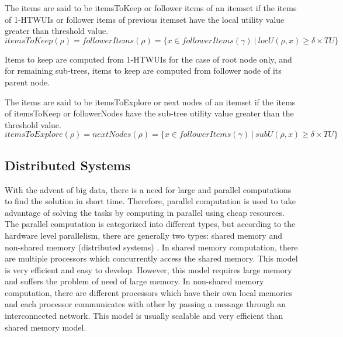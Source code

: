 \documentclass[11pt,openright]{report}
\begin{document}
\begin{definition}
	The items are said to be itemsToKeep or follower items of an itemset if the items of 1-HTWUIs or follower items of previous itemset have the local utility value greater than threshold value.
	\begin{equation}
	itemsToKeep(\rho) = followerItems(\rho) = \{x \in followerItems(\gamma)\ |\ locU(\rho, x) \geq \delta \times TU\}
	\label{eq:itemsToKeep}
	\end{equation}
		\label{def:itemsToKeep}
\end{definition}
Items to keep are computed from 1-HTWUIs for the case of root node only, and for remaining sub-trees, items to keep are computed from follower node of its parent node.
	
\begin{definition}
	The items are said to be itemsToExplore or next nodes of an itemset if the items of itemsToKeep or followerNodes have the sub-tree utility value greater than the threshold value.
	\begin{equation}
		itemsToExplore(\rho) = nextNodes(\rho) = \{x \in followerItems(\gamma)\ |\ subU(\rho, x) \geq \delta \times TU\}
		\label{eq:itemsToExplore}
	\end{equation}
	\label{def:itemsToExplore}
\end{definition}

\subsection{Distributed Systems}
With the advent of big data, there is a need for large and parallel computations to find the solution in short time. Therefore, parallel computation is used to take advantage of solving the tasks by computing in parallel using cheap resources. The parallel computation is categorized into different types, but according to the hardware level parallelism, there are generally two types: shared memory and non-shared memory (distributed systems) \cite{Dean2008}. In shared memory computation, there are multiple processors which concurrently access the shared memory. This model is very efficient and easy to develop. However, this model requires large memory and suffers the problem of need of large memory. In non-shared memory computation, there are different processors which have their own local memories and each processor communicates with other by passing a message through an interconnected network. This model is usually scalable and very efficient than shared memory model. 
\end{document}
